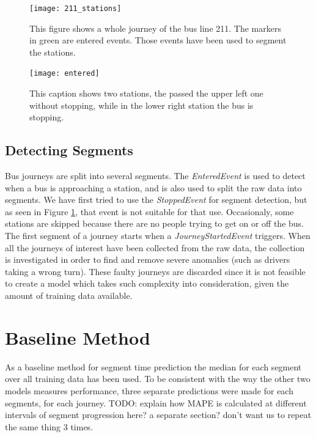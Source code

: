 \begin{figure}[t!]
\begin{minipage}{.5\textwidth}
	\texttt{[image: 211\_stations]}
	\caption{This figure shows a whole journey of the bus line 211. The markers in green are entered events. Those events have been used to segment the stations.}
	\label{fig:211_stations}
\end{minipage}
\hspace{5pt}
\begin{minipage}{.48\textwidth}
\texttt{[image: entered]}
\caption{This caption shows two stations,  the passed the upper left one without stopping, while in the lower right station the bus is stopping.}
\label{fig:entered}
\end{minipage}
\end{figure}


\subsection{Detecting Segments}
Bus journeys are split into several segments. The \textit{EnteredEvent} is used to detect when a bus is approaching a station, and is also used to split the raw data into segments.  We have first tried to use the \textit{StoppedEvent} for segment detection, but as seen in Figure \ref{fig:entered}, that event is not suitable for that use. Occasionaly, some stations are skipped because there are no people trying to get on or off the bus.
The first segment of a journey starts when a \textit{JourneyStartedEvent} triggers. When all the journeys of interest have been collected from the raw data, the collection is investigated in order to find and remove severe anomalies (such as drivers taking a wrong turn). These faulty journeys are discarded since it is not feasible to create a model which takes such complexity into consideration, given the amount of training data available.

\section{Baseline Method}
As a baseline method for segment time prediction the median for each segment over all training data has been used. To be consistent with the way the other two models measures performance, three separate predictions were made for each segments, for each journey. TODO: explain how MAPE is calculated at different intervals of segment progression here? a separate section? don't want us to repeat the same thing 3 times.

